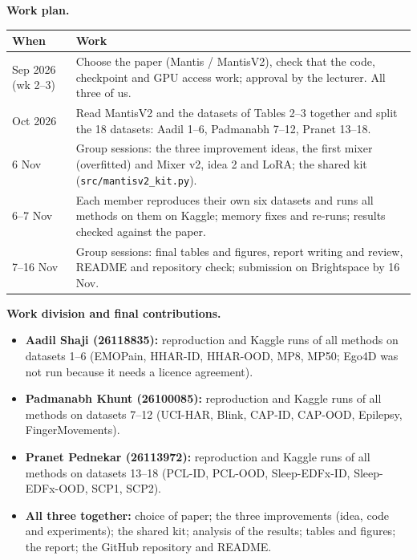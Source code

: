 \documentclass[conference]{IEEEtran}
\begin{document}
\textbf{Work plan.}

\smallskip
\noindent\footnotesize
\begin{tabular}{@{}p{}p{}@{}}
\toprule
When & Work \\
\midrule
Sep 2026 (wk 2--3) & Choose the paper (Mantis / MantisV2), check that the code, checkpoint and GPU access work;
approval by the lecturer. All three of us. \\
Oct 2026 & Read MantisV2 and the datasets of Tables 2--3 together and split the 18 datasets: Aadil 1--6,
Padmanabh 7--12, Pranet 13--18. \\
6 Nov & Group sessions: the three improvement ideas, the first mixer (overfitted) and Mixer v2, idea 2 and LoRA;
the shared kit (\texttt{src/mantisv2\_kit.py}). \\
6--7 Nov & Each member reproduces their own six datasets and runs all methods on them on Kaggle; memory fixes and
re-runs; results checked against the paper. \\
7--16 Nov & Group sessions: final tables and figures, report writing and review, README and repository check;
submission on Brightspace by 16 Nov. \\
\bottomrule
\end{tabular}
\normalsize

\medskip
\textbf{Work division and final contributions.}
\begin{itemize}
\item \textbf{Aadil Shaji (26118835):} reproduction and Kaggle runs of all methods on datasets 1--6 (EMOPain,
HHAR-ID, HHAR-OOD, MP8, MP50; Ego4D was not run because it needs a licence agreement).
\item \textbf{Padmanabh Khunt (26100085):} reproduction and Kaggle runs of all methods on datasets 7--12 (UCI-HAR,
Blink, CAP-ID, CAP-OOD, Epilepsy, FingerMovements).
\item \textbf{Pranet Pednekar (26113972):} reproduction and Kaggle runs of all methods on datasets 13--18 (PCL-ID,
PCL-OOD, Sleep-EDFx-ID, Sleep-EDFx-OOD, SCP1, SCP2).
\item \textbf{All three together:} choice of paper; the three improvements (idea, code and experiments); the shared
kit; analysis of the results; tables and figures; the report; the GitHub repository and README.
\end{itemize}
\end{document}
